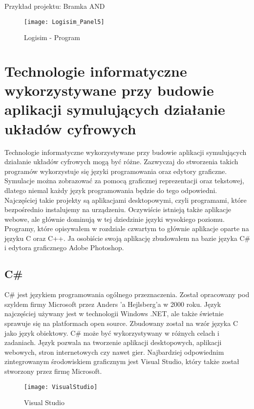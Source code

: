 \documentclass[12pt, a4paper, onside, polish]{article}				%
\begin{document}
  \cleardoublepage
 Przykład projektu: Bramka AND
  	\begin{figure}[hbt!]
  	  {\centering \texttt{[image: Logisim\_Panel5]} \caption{Logisim - Program}}\vspace{5mm}
  	 \end{figure}

\cleardoublepage



\section{Technologie informatyczne wykorzystywane przy budowie aplikacji symulujących działanie układów cyfrowych}

Technologie informatyczne wykorzystywane przy budowie aplikacji symulujących działanie układów cyfrowych mogą być różne. Zazwyczaj do stworzenia takich programów wykorzystuje się języki programowania oraz edytory graficzne. Symulacje można zobrazować za pomocą graficznej reprezentacji oraz tekstowej, dlatego niemal każdy język programowania będzie do tego odpowiedni. Najczęściej takie projekty są aplikacjami desktopowymi, czyli programami, które bezpośrednio instalujemy na urządzeniu. Oczywiście istnieją także aplikacje webowe, ale głównie dominują w tej dziedzinie języki wysokiego poziomu. Programy, które opisywałem w rozdziale czwartym to głównie aplikacje oparte na języku C oraz C++. Ja osobiście swoją aplikację zbudowałem na bazie języka C\# i edytora graficznego Adobe Photoshop.  
\subsection{C\#}
\hspace{\parindent}
C\# jest językiem programowania ogólnego przeznaczenia. Został opracowany pod szyldem firmy Microsoft przez Anders 'a Hejlsberg’a w 2000 roku. Język najczęściej używany jest w technologii Windows .NET, ale także świetnie sprawuje się na platformach open source. Zbudowany został na wzór języka C jako język obiektowy. C\# może być wykorzystywany w różnych celach i zadaniach. Język pozwala na tworzenie aplikacji desktopowych, aplikacji webowych, stron internetowych czy nawet gier. Najbardziej odpowiednim zintegrowanym środowiskiem graficznym jest Visual Studio, który także został stworzony przez firmę Microsoft.
   	\begin{figure}[hbt!]
  	  {\centering \texttt{[image: VisualStudio]} \caption{Visual Studio}}\vspace{5mm}
  	 \end{figure}
\end{document}
